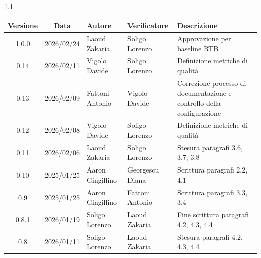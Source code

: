 \documentclass[a4paper,12pt]{article}
\begin{document}
\begin{spacing}{1.1}
    \begin{longtable}{|c|c|p{3.2cm}|p{3.2cm}|p{5cm}|}
        \hline
        \textbf{Versione} & \textbf{Data} & \textbf{Autore}  & \textbf{Verificatore} & \textbf{Descrizione} \\
        \hline
        1.0.0             & 2026/02/24    & Laoud Zakaria    & Soligo Lorenzo        & Approvazione per baseline RTB \\
        \hline
        0.14              & 2026/02/11    & Vigolo Davide    & Soligo Lorenzo        & Definizione metriche di qualità                                                                                                          \\
        \hline
        0.13              & 2026/02/09    & Fattoni Antonio  & Vigolo Davide         & Correzione processo di documentazione e controllo della configurazione                                                                   \\
        \hline
        0.12              & 2026/02/08    & Vigolo Davide    & Soligo Lorenzo        & Definizione metriche di qualità                                                                                                          \\
        \hline
        0.11              & 2026/02/06    & Laoud Zakaria    & Soligo Lorenzo        & Stesura paragrafi 3.6, 3.7, 3.8                                                                                                          \\
        \hline
        0.10              & 2025/01/25    & Aaron Gingillino & Georgescu Diana       & Scrittura paragrafi 2.2, 4.1                                                                                                             \\
        \hline
        0.9               & 2025/01/25    & Aaron Gingillino & Fattoni Antonio       & Scrittura paragrafi 3.3, 3.4                                                                                                             \\
        \hline
        0.8.1             & 2026/01/19    & Soligo Lorenzo   & Laoud Zakaria         & Fine scrittura paragrafi 4.2, 4.3, 4.4                                                                                                   \\
        \hline
        0.8               & 2026/01/11    & Soligo Lorenzo   & Laoud Zakaria         & Stesura paragrafi 4.2, 4.3, 4.4                                                                                                          \\

\end{longtable}
\end{spacing}
\end{document}
